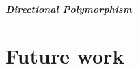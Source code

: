 \documentclass[11pt]{iuthesis}
\begin{document}
\paragraph{Directional Polymorphism}

%





\chapter{Future work}



\printbibliography


\newpage

\end{document}
